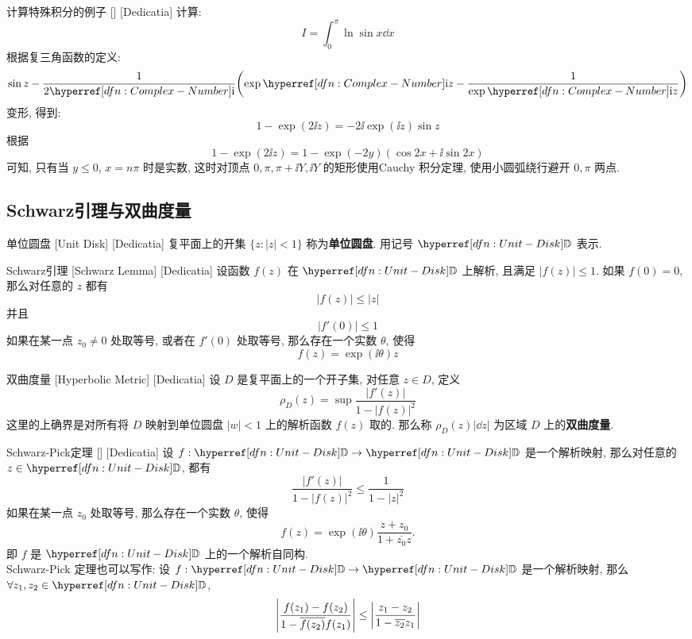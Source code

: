         \begin{xmp}
            {计算特殊积分的例子}
            []
            [Dedicatia]
            计算: 
            \[I=\int_0^\pi \ln\sin x\dd{x}\]
            根据复三角函数的定义: 
            \[\sin z-\frac{1}{2\ii}\qty(\exp\ii z-\frac{1}{\exp\ii z})\]
            变形, 得到: 
            \[1-\exp(2\ii z)=-2\ii\exp(\ii z)\sin z\]
            根据
            \[1-\exp(2\ii z)=1-\exp(-2y)(\cos 2x+\ii\sin 2x)\]
            可知, 只有当 \(y\leq 0\),  \(x=n\pi\) 时是实数, 这时对顶点 \(0, \pi, \pi+\ii Y, \ii Y\) 的矩形使用Cauchy 积分定理, 使用小圆弧绕行避开 \(0, \pi\) 两点. \bysorry
        \end{xmp}

    \subsection{Schwarz引理与双曲度量}

        \begin{dfn}
            {单位圆盘}
            [Unit Disk]
            [Dedicatia]
            复平面上的开集 \(\{z:|z|<1\}\) 称为\textbf{单位圆盘}. 用记号 \(\D\) 表示.
        \end{dfn}

        \begin{thm}
            [Schwarz]
            {Schwarz引理}
            [Schwarz Lemma]
            [Dedicatia]
            设函数 \(f(z)\) 在 \(\D\) 上解析, 且满足 \(|f(z)|\leq 1\). 如果 \(f(0)=0\), 那么对任意的 \(z\) 都有
            \[|f(z)|\leq |z|\]
            并且
            \[|f'(0)|\leq 1\]
            如果在某一点 \(z_0\neq 0\) 处取等号, 或者在 \(f'(0)\) 处取等号, 那么存在一个实数 \(\theta\), 使得
            \[f(z)=\exp(\ii\theta)z\]
        \end{thm}

        \begin{dfn}
            {双曲度量}
            [Hyperbolic Metric]
            [Dedicatia]
            设 \(D\) 是复平面上的一个开子集, 对任意 \(z\in D\), 定义
            \[\rho_D(z)=\sup\frac{|f'(z)|}{1-|f(z)|^2}\]
            这里的上确界是对所有将 \(D\) 映射到单位圆盘 \(|w|<1\) 上的解析函数 \(f(z)\) 取的. 那么称 \(\rho_D(z)|\dd{z}|\) 为区域 \(D\) 上的\textbf{双曲度量}.
        \end{dfn}

        \begin{thm}
            {Schwarz-Pick定理}
            []
            [Dedicatia]
            设 \(f:\D\to\D\) 是一个解析映射, 那么对任意的 \(z\in\D\), 都有
            \[\frac{|f'(z)|}{1-|f(z)|^2}\leq \frac{1}{1-|z|^2}\]
            如果在某一点 \(z_0\) 处取等号, 那么存在一个实数 \(\theta\), 使得
            \[f(z)=\exp(\ii\theta)\frac{z+z_0}{1+\overline{z_0}z}.\]
            即 \(f\) 是 \(\D\) 上的一个解析自同构.\\
            Schwarz-Pick 定理也可以写作: 设 \(f:\D\to\D\) 是一个解析映射, 那么 \(\forall z_1,z_2\in\D\), 
            \[\vqty{\frac{f(z_1)-f(z_2)}{1-\overline{f(z_2)}f(z_1)}} \leq \vqty{\frac{z_1-z_2}{1-\overline{z_2}z_1}}\]
        \end{thm}

